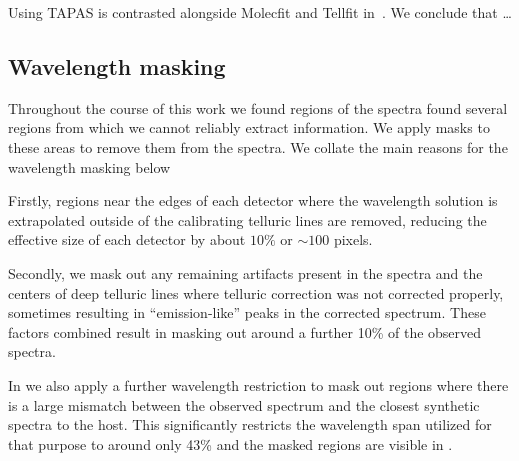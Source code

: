 

Using TAPAS is contrasted alongside Molecfit and Tellfit in~\cite{ulmer-moll_telluric_2018}. We conclude that \ldots

\subsection{Wavelength masking}
Throughout the course of this work we found regions of the spectra found several regions from which we cannot reliably extract information.
We apply masks to these areas to remove them from the spectra. We collate the main reasons for the wavelength masking below 

Firstly, regions near the edges of each detector where the wavelength solution is extrapolated outside of the calibrating telluric lines are removed, reducing the effective size of each detector by about \(10\%\) or \(\sim100\) pixels. 

Secondly, we mask out any remaining artifacts present in the spectra and the centers of deep telluric lines where telluric correction was not corrected properly, sometimes resulting in ``emission-like'' peaks in the corrected spectrum. These factors combined result in masking out around a further 10\% of the observed spectra. 

In  we also apply a further wavelength restriction to mask out regions where there is a large mismatch between the observed spectrum and the closest synthetic spectra to the host. This significantly restricts the wavelength span utilized for that purpose to around only 43\% and the masked regions are visible in . 




